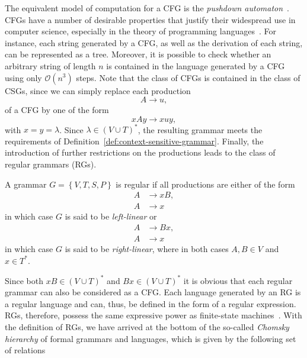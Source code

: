 The equivalent model of computation for a CFG is the \emph{pushdown automaton}~\cite{linz2006introduction}.  
CFGs have a number of desirable properties that justify their widespread use in computer science, especially in the theory of programming languages~\cite{pierce2002types}.
For instance, each string generated by a CFG, as well as the derivation of each string, can be represented as a tree.
Moreover, it is possible to check whether an arbitrary string of length $n$ is contained in the language generated by a CFG using only $\mathcal{O}(n^3)$ steps.
Note that the class of CFGs is contained in the class of CSGs, since we can simply replace each production 
\begin{equation}
	A \to u,
\end{equation}
of a CFG by one of the form
\begin{equation}
	xAy \to xuy,
\end{equation}
with $x = y = \lambda$. 
Since $\lambda \in \left(V \cup T\right)^*$, the resulting grammar meets the requirements of Definition~\ref{def:context-sensitive-grammar}.
Finally, the introduction of further restrictions on the productions leads to the class of regular grammars (RGs).
\begin{definition}
	A grammar $G = \left\{V, T, S, P\right\}$ is regular if all productions are either of the form
	\begin{equation*}
		\begin{split}
			A & \to xB, \\
			A & \to x
		\end{split}
	\end{equation*}
in which case $G$ is said to be \emph{left-linear} or 
	\begin{equation*}
	\begin{split}
		A & \to Bx, \\
		A & \to x
	\end{split}
	\end{equation*}
in which case $G$ is said to be \emph{right-linear}, where in both cases $A, B \in V$ and $x \in T^*$.
\end{definition}
Since both $xB \in \left(V \cup T\right)^*$ and $Bx \in \left(V \cup T\right)^*$ it is obvious that each regular grammar can also be considered as a CFG.
Each language generated by an RG is a regular language and can, thus, be defined in the form of a regular expression. 
RGs, therefore, possess the same expressive power as finite-state machines~\cite{linz2006introduction}.
With the definition of RGs, we have arrived at the bottom of the so-called \emph{Chomsky hierarchy} of formal grammars and languages, which is given by the following set of relations
